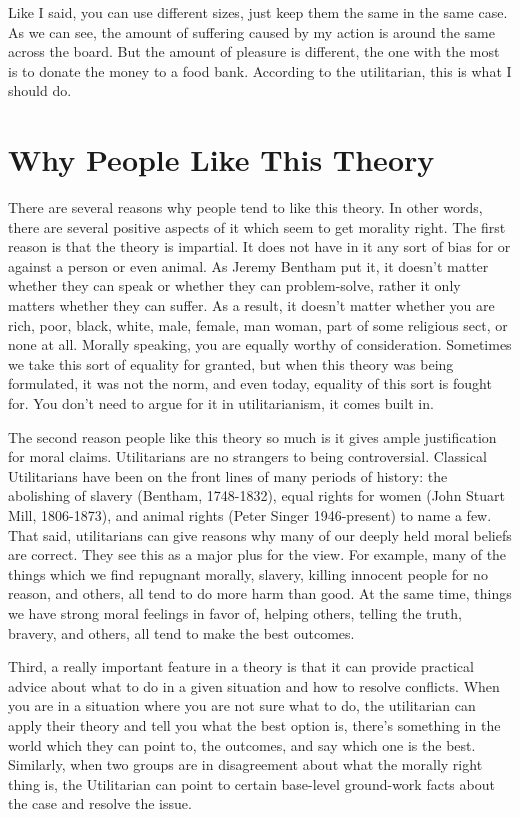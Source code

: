 Like I said, you can use different sizes, just keep them the same in the same case. As we can see, the amount of suffering caused by my action is around the same across the board. But the amount of pleasure is different, the one with the most is to donate the money to a food bank. According to the utilitarian, this is what I should do.

\section{Why People Like This Theory}

There are several reasons why people tend to like this theory. In other words, there are several positive aspects of it which seem to get morality right. The first reason is that the theory is impartial. It does not have in it any sort of bias for or against a person or even animal. As Jeremy Bentham put it, it doesn't matter whether they can speak or whether they can problem-solve, rather it only matters whether they can suffer. As a result, it doesn't matter whether you are rich, poor, black, white, male, female, man woman, part of some religious sect, or none at all. Morally speaking, you are equally worthy of consideration. Sometimes we take this sort of equality for granted, but when this theory was being formulated, it was not the norm, and even today, equality of this sort is fought for. You don’t need to argue for it in utilitarianism, it comes built in.

The second reason people like this theory so much is it gives ample justification for moral claims. Utilitarians are no strangers to being controversial. Classical Utilitarians have been on the front lines of many periods of history: the abolishing of slavery (Bentham, 1748-1832), equal rights for women (John Stuart Mill, 1806-1873), and animal rights (Peter Singer 1946-present) to name a few. That said, utilitarians can give reasons why many of our deeply held moral beliefs are correct. They see this as a major plus for the view. For example, many of the things which we find repugnant morally, slavery, killing innocent people for no reason, and others, all tend to do more harm than good. At the same time, things we have strong moral feelings in favor of, helping others, telling the truth, bravery, and others, all tend to make the best outcomes.

Third, a really important feature in a theory is that it can provide practical advice about what to do in a given situation and how to resolve conflicts. When you are in a situation where you are not sure what to do, the utilitarian can apply their theory and tell you what the best option is, there’s something in the world which they can point to, the outcomes, and say which one is the best. Similarly, when two groups are in disagreement about what the morally right thing is, the Utilitarian can point to certain base-level ground-work facts about the case and resolve the issue.

